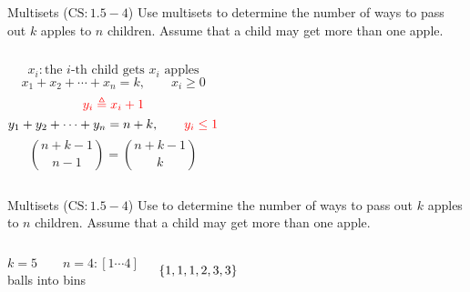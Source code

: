 
\begin{frame}{}
  \begin{exampleblock}{Multisets ($\text{CS}: 1.5-4$)}
    Use multisets to determine the number of ways to pass out $k$  apples to $n$ children. 
    Assume that a child may get more than one apple.
  \end{exampleblock}

  \vspace{0.30cm}
  \begin{columns}
      \pause
      \[
	x_i: \text{the $i$-th child gets $x_i$ apples}
      \]
      \[
	x_1 + x_2 + \cdots + x_n = k, \qquad x_i \ge 0
      \]
      \pause
      \[
	\textcolor{red}{y_i \triangleq x_i + 1}
      \]
      \pause
      \[
	y_1 + y_2 + \cdots + y_n = n + k, \qquad \textcolor{red}{y_i \le 1}
      \]
      \pause 
      \[
	\binom{n+k-1}{n-1} = \binom{n+k-1}{k}
      \]
  \end{columns}
\end{frame}

\begin{frame}{}
  \begin{exampleblock}{Multisets ($\text{CS}: 1.5-4$)}
    Use  to determine the number of ways to pass out $k$  apples to $n$ children. 
    Assume that a child may get more than one apple.
  \end{exampleblock}

  \vspace{0.50cm}
  \begin{columns}
      \vspace{-0.50cm}
      \vspace{-0.20cm}
      \[
	k = 5 \qquad n = 4: [1 \cdots 4]
      \]
      balls into bins

      \[
	\{1,1,1,2,3,3\}
      \]
  \end{columns}
\end{frame}


